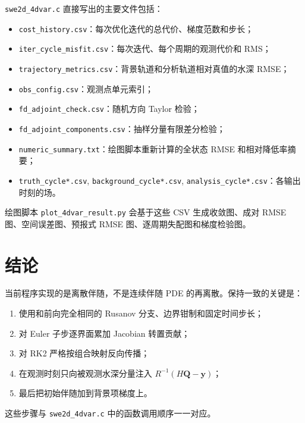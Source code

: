 \documentclass[12pt,a4paper]{article}
\begin{document}
\texttt{swe2d\_4dvar.c} 直接写出的主要文件包括：
\begin{itemize}
\item \texttt{cost\_history.csv}：每次优化迭代的总代价、梯度范数和步长；
\item \texttt{iter\_cycle\_misfit.csv}：每次迭代、每个周期的观测代价和 RMS；
\item \texttt{trajectory\_metrics.csv}：背景轨道和分析轨道相对真值的水深 RMSE；
\item \texttt{obs\_config.csv}：观测点单元索引；
\item \texttt{fd\_adjoint\_check.csv}：随机方向 Taylor 检验；
\item \texttt{fd\_adjoint\_components.csv}：抽样分量有限差分检验；
\item \texttt{numeric\_summary.txt}：绘图脚本重新计算的全状态 RMSE 和相对降低率摘要；
\item \texttt{truth\_cycle*.csv}, \texttt{background\_cycle*.csv},
      \texttt{analysis\_cycle*.csv}：各输出时刻的场。
\end{itemize}
绘图脚本 \texttt{plot\_4dvar\_result.py} 会基于这些 CSV 生成收敛图、成对
RMSE 图、空间误差图、预报式 RMSE 图、逐周期失配图和梯度检验图。

\section{结论}

当前程序实现的是离散伴随，不是连续伴随 PDE 的再离散。保持一致的关键是：
\begin{enumerate}
\item 使用和前向完全相同的 Rusanov 分支、边界钳制和固定时间步长；
\item 对 Euler 子步逐界面累加 Jacobian 转置贡献；
\item 对 RK2 严格按组合映射反向传播；
\item 在观测时刻只向被观测水深分量注入 $R^{-1}(H\mathbf{Q}-\mathbf{y})$；
\item 最后把初始伴随加到背景项梯度上。
\end{enumerate}
这些步骤与 \texttt{swe2d\_4dvar.c} 中的函数调用顺序一一对应。
\end{document}
